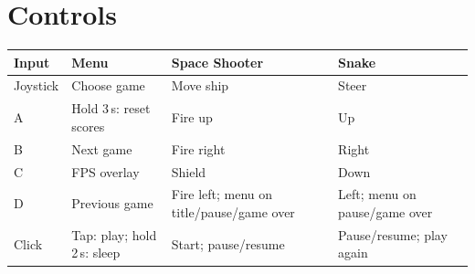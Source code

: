 \documentclass[11pt,a4paper]{article}
\begin{document}
\section{Controls}
\begin{center}\small
\begin{tabularx}{\linewidth}{lXXX}
\toprule
\textbf{Input} & \textbf{Menu} & \textbf{Space Shooter} & \textbf{Snake} \\
\midrule
Joystick & Choose game & Move ship & Steer \\
A & Hold 3\,s: reset scores & Fire up & Up \\
B & Next game & Fire right & Right \\
C & FPS overlay & Shield & Down \\
D & Previous game & Fire left; menu on title/pause/game over & Left; menu on pause/game over \\
Click & Tap: play; hold 2\,s: sleep & Start; pause/resume & Pause/resume; play again \\
\bottomrule
\end{tabularx}
\end{center}
\end{document}
